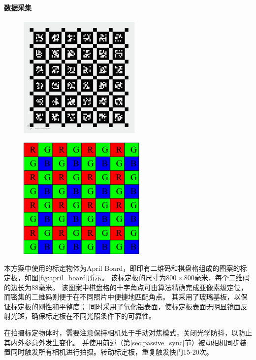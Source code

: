 \paragraph{数据采集}
\begin{figure}
    \centering
    \begin{minipage}{0.5\textwidth}
        \centering
        \includegraphics[height=6cm]{figures/april_board}
        \label{fig:april_board}
    \end{minipage}%
    \begin{minipage}{0.5\textwidth}
        \centering
        \includegraphics[height=6cm]{figures/bayer}
        \label{fig:bayer}
    \end{minipage}%
\end{figure}

本方案中使用的标定物体为April Board，即印有二维码和棋盘格组成的图案的标定板，如图\ref{fig:april_board}所示。
该标定板的尺寸为$800 \times 800$毫米，每个二维码的边长为$88$毫米。
该图案中棋盘格的十字角点可由算法精确完成亚像素级定位，而密集的二维码则便于在不同照片中便捷地匹配角点。
其采用了玻璃基板，以保证标定板的刚性和平整度；
同时采用了氧化铝表面，使标定板表面无明显镜面反射光斑，确保标定板在不同光照条件下的可靠性。

在拍摄标定物体时，需要注意保持相机处于手动对焦模式，关闭光学防抖，以防止其内外参意外发生变化。
并使用前述（第\ref{sec:passive_sync}节）被动相机同步装置同时触发所有相机进行拍摄。转动标定板，重复触发快门15-20次。

